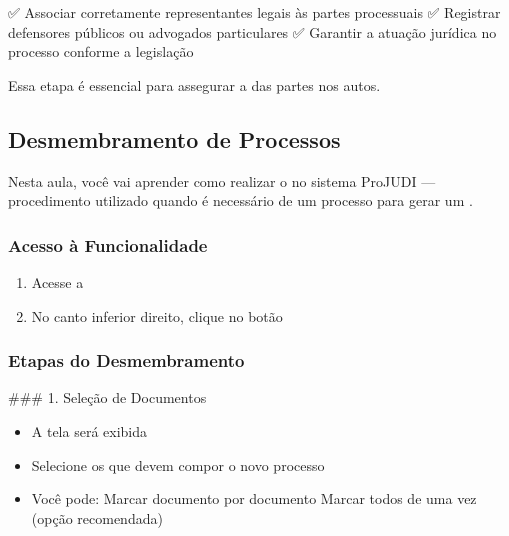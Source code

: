 \documentclass[letterpaper,10pt,brazil]{sphinxmanual}
\begin{document}
\sphinxAtStartPar
✅ Associar corretamente representantes legais às partes processuais
✅ Registrar defensores públicos ou advogados particulares
✅ Garantir a atuação jurídica no processo conforme a legislação

\sphinxAtStartPar
Essa etapa é essencial para assegurar a  das partes nos autos.

\sphinxstepscope


\subsection{Desmembramento de Processos}
\label{\detokenize{projud_27_desmembramentoprocesso:desmembramento-de-processos}}\label{\detokenize{projud_27_desmembramentoprocesso::doc}}
\sphinxAtStartPar
Nesta aula, você vai aprender como realizar o  no sistema ProJUDI — procedimento utilizado quando é necessário  de um processo para gerar um .


\subsubsection{Acesso à Funcionalidade}
\label{\detokenize{projud_27_desmembramentoprocesso:acesso-a-funcionalidade}}\begin{enumerate}
%
\item {} 
\sphinxAtStartPar
Acesse a 

\item {} 
\sphinxAtStartPar
No canto inferior direito, clique no botão 

\end{enumerate}


\subsubsection{Etapas do Desmembramento}
\label{\detokenize{projud_27_desmembramentoprocesso:etapas-do-desmembramento}}
\sphinxAtStartPar
\#\#\# 1. Seleção de Documentos
\begin{itemize}
\item {} 
\sphinxAtStartPar
A tela  será exibida

\item {} 
\sphinxAtStartPar
Selecione os  que devem compor o novo processo

\item {} 
\sphinxAtStartPar
Você pode:
\sphinxhyphen{} Marcar documento por documento
\sphinxhyphen{} Marcar todos de uma vez (opção recomendada)

\end{itemize}
\end{document}
